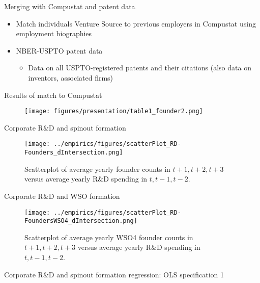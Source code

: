 \documentclass[english,usenames,dvipsnames]{beamer}
\begin{document}
\begin{frame}{Merging with Compustat and patent data}
\begin{itemize}
\item Match individuals Venture Source to previous employers in Compustat using employment biographies
\item NBER-USPTO patent data
\begin{itemize}
	\item Data on all USPTO-registered patents and their citations (also data on inventors, associated firms)
\end{itemize}
\end{itemize}
\end{frame}

\begin{frame}{Results of match to Compustat}
\begin{figure}
	\texttt{[image: figures/presentation/table1\_founder2.png]}
\end{figure}
\end{frame}

\begin{frame}{Corporate R\&D and spinout formation}
\begin{figure}[!htb]
	\centering
	\texttt{[image: ../empirics/figures/scatterPlot\_RD-Founders\_dIntersection.png]}
	\caption{Scatterplot of average yearly founder counts in $t+1,t+2,t+3$ versus average yearly R\&D spending in $t,t-1,t-2$.}
\end{figure}
\end{frame}

\begin{frame}{Corporate R\&D and WSO formation}

\begin{figure}[!htb]
\centering
\texttt{[image: ../empirics/figures/scatterPlot\_RD-FoundersWSO4\_dIntersection.png]}
\caption{Scatterplot of average yearly WSO4 founder counts in $t+1,t+2,t+3$ versus average yearly R\&D spending in $t,t-1,t-2$.}
\end{figure}
\end{frame}

\begin{frame}{Corporate R\&D and spinout formation regression: OLS specification 1}
\begin{table}
\Tiny
\centering

\caption{\tiny The dependent variable is average yearly number of founders joining startups in years $t+1,t+2,t+3$. The independent variables are averages over $t,t-1,t-2$. Firm controls are employment, assets, intangible assets, investment, net income, cumulative citation-weighted patents, and the product of Tobin's Q and Assets. Standard errors are clustered by firm.}
\end{table}
\end{frame}
\end{document}
